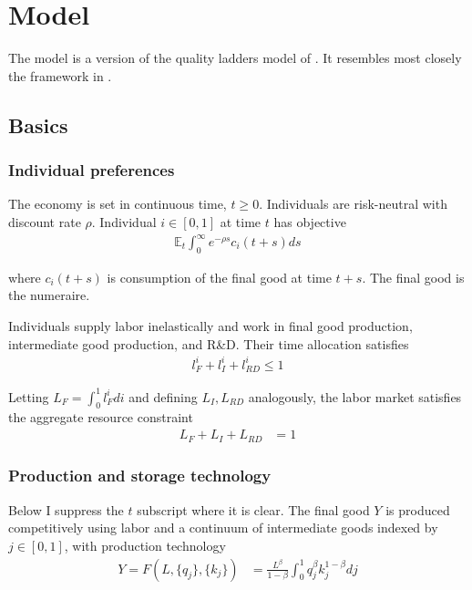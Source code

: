 \documentclass[12pt,english]{article}
\theoremstyle{remark}
\begin{document}
\section{Model}\label{model}

The model is a version of the quality ladders model of \cite{grossman_quality_1991}. It resembles most closely the framework in \cite{akcigit_growth_2018}.  

\subsection{Basics}

\subsubsection{Individual preferences}

The economy is set in continuous time, $t \ge 0$. Individuals are risk-neutral with discount rate $\rho$. Individual $i \in [0,1]$ at time $t$ has objective
\begin{align*}
 \mathbb{E}_t \int_0^{\infty} e^{-\rho s} c_i(t+s) ds
\end{align*}

where $c_i(t+s)$ is consumption of the final good at time $t+s$. The final good is the numeraire.

Individuals supply labor inelastically and work in final good production, intermediate good production, and R\&D. Their time allocation satisfies
\begin{align*}
l_F^i + l_I^i + l_{RD}^i \le 1
\end{align*}

Letting $L_F = \int_0^1 l_F^i di$ and defining $L_I,L_{RD}$ analogously, the labor market satisfies the aggregate resource constraint
\begin{align}
L_F + L_I + L_{RD} &= 1 \label{labor_resource_constraint}
\end{align}


\subsubsection{Production and storage technology}

Below I suppress the $t$ subscript where it is clear. The final good $Y$ is produced competitively using labor and a continuum of intermediate goods indexed by $j \in [0,1]$, with production technology
\begin{align*}
Y = F(L,\{q_j\},\{k_j\}) &= \frac{L^{\beta}}{1-\beta} \int_0^1 q_j^{\beta} k_j^{1-\beta} dj
\end{align*}
\end{document}
